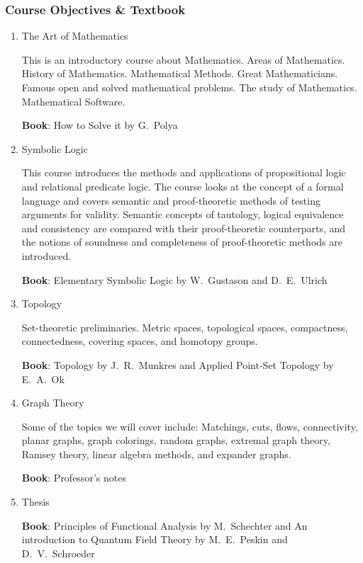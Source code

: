 \documentclass[11pt]{article}
\begin{document}
\subsubsection*{Course Objectives \& Textbook}
\begin{enumerate}
    \item The Art of Mathematics
    
    This is an introductory course about Mathematics. Areas of Mathematics. History of Mathematics. Mathematical Methods. Great Mathematicians. Famous open and solved mathematical problems. The study of Mathematics. Mathematical Software.
    
    \textbf{Book}: How to Solve it by G.\ Polya

    \item Symbolic Logic
    
    This course introduces the methods and applications of propositional logic and relational predicate logic. The course looks at the concept of a formal language and covers semantic and proof-theoretic methods of testing arguments for validity. Semantic concepts of tautology, logical equivalence and consistency are compared with their proof-theoretic counterparts, and the notions of soundness and completeness of proof-theoretic methods are introduced.
    
    \textbf{Book}: Elementary Symbolic Logic by  W.\ Gustason and D.\ E.\ Ulrich
    
    \item Topology
    
    Set-theoretic preliminaries. Metric spaces, topological spaces, compactness, connectedness, covering spaces, and homotopy groups.
    
    \textbf{Book}: Topology by J.\ R.\ Munkres and Applied Point-Set Topology by E.\ A.\ Ok
    
    \item Graph Theory
    
    Some of the topics we will cover include: Matchings, cuts, flows, connectivity, planar graphs, graph colorings, random graphs, extremal graph theory, Ramsey theory, linear algebra methods, and expander graphs.
    
    \textbf{Book}: Professor's notes
    
    \item Thesis
    
    \textbf{Book}: Principles of Functional Analysis by M.\ Schechter and An introduction to Quantum Field Theory by M.\ E.\ Peskin and D.\ V.\ Schroeder
\end{enumerate}
\end{document}
